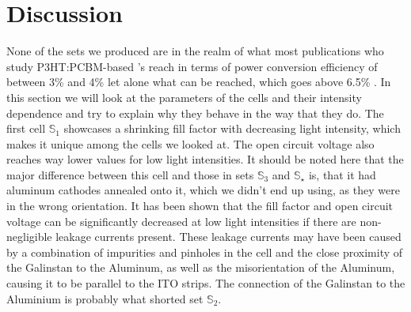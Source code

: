 
\section{Discussion}\label{sec:discussion}
%
%
None of the sets we produced are in the realm of what most publications who study P3HT:PCBM-based \BHSC's reach in terms of power conversion efficiency of between 3\% and 4\% let alone what can be reached, which goes above 6.5\% \cite{source13}. In this section we will look at the parameters of the cells and their intensity dependence and try to explain why they behave in the way that they do.\mypar
The first cell $\mathbb{S}_1$ showcases a shrinking fill factor with decreasing light intensity, which makes it unique among the cells we looked at. The open circuit voltage also reaches way lower values for low light intensities. It should be noted here that the major difference between this cell and those in sets $\mathbb{S}_3$ and $\mathbb{S}_\star$ is, that it had aluminum cathodes annealed onto it, which we didn't end up using, as they were in the wrong orientation. It has been shown \cite{source12} that the fill factor and open circuit voltage can be significantly decreased at low light intensities if there are non-negligible leakage currents present. These leakage currents may have been caused by a combination of impurities and pinholes in the cell and the close proximity of the Galinstan to the Aluminum, as well as the misorientation of the Aluminum, causing it to be parallel to the ITO strips. The connection of the Galinstan to the Aluminium is probably what shorted set $\mathbb{S}_2$.\mypar
